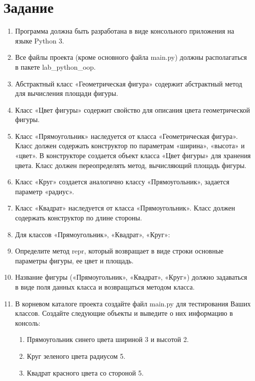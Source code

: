\documentclass{article}
\begin{document}
\section{Задание}
\begin{enumerate}
    \item Программа должна быть разработана в виде консольного приложения на языке Python 3.

    \item Все файлы проекта (кроме основного файла main.py) должны располагаться в пакете lab\_python\_oop.

    \item Абстрактный класс «Геометрическая фигура» содержит абстрактный метод для вычисления площади фигуры.

    \item Класс «Цвет фигуры» содержит свойство для описания цвета геометрической фигуры.

    \item Класс «Прямоугольник» наследуется от класса «Геометрическая фигура». Класс должен содержать конструктор по параметрам «ширина», «высота» и «цвет». В конструкторе создается объект класса «Цвет фигуры» для хранения цвета. Класс должен переопределять метод, вычисляющий площадь фигуры.

    \item Класс «Круг» создается аналогично классу «Прямоугольник», задается параметр «радиус».

    \item Класс «Квадрат» наследуется от класса «Прямоугольник». Класс должен содержать конструктор по длине стороны.

    \item Для классов «Прямоугольник», «Квадрат», «Круг»:

    \item Определите метод repr, который возвращает в виде строки основные параметры фигуры, ее цвет и площадь.

    \item Название фигуры («Прямоугольник», «Квадрат», «Круг») должно задаваться в виде поля данных класса и возвращаться методом класса.

    \item В корневом каталоге проекта создайте файл main.py для тестирования Ваших классов. Создайте следующие объекты и выведите о них информацию в консоль:
          \begin{enumerate}
              \item Прямоугольник синего цвета шириной 3 и высотой 2.

              \item Круг зеленого цвета радиусом 5.

              \item Квадрат красного цвета со стороной 5.
          \end{enumerate}
\end{enumerate}
\end{document}
